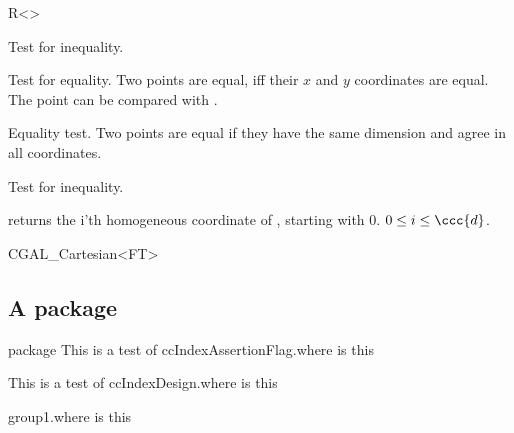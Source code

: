\documentclass{article}
\begin{document}
{{{{\begin{ccClassTemplate}{R<>}
\pagebreak

     { Test for inequality. }

       {Test for equality. Two points are equal, iff their $x$ and $y$
        coordinates are equal. The point can be compared with
                .}



        {Equality test. Two points are equal if they have the same
         dimension and agree in all coordinates.}

        {Test for inequality.}


        {returns the i'th homogeneous coordinate of \ccVar, starting
         with 0. \ccPrecond $0\leq i\leq \ccc{d}$.}
\end{ccClassTemplate}


\begin{ccClassTemplate}{CGAL_Cartesian<FT>}
\pagebreak
\end{ccClassTemplate}

\subsection{A package}

\begin{ccPackage}{package}
This is a test of ccIndexAssertionFlag\ccIndexAssertionFlag.where is this

This is a test of ccIndexDesign\ccIndexDesign.where is this

\begin{ccIndexGlobalFunctions}
\pagebreak

group1.where is this


\end{ccIndexGlobalFunctions}
\end{ccPackage}}}}}
\end{document}
